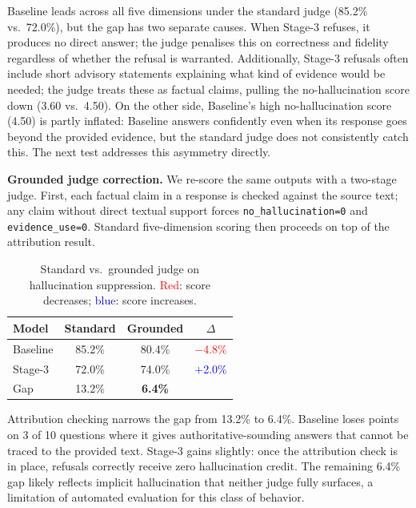 Baseline leads across all five dimensions under the standard judge
(85.2\% vs.\ 72.0\%), but the gap has two separate causes.
When Stage-3 refuses, it produces no direct answer; the judge penalises this
on correctness and fidelity regardless of whether the refusal is warranted.
Additionally, Stage-3 refusals often include short advisory statements
explaining what kind of evidence would be needed; the judge treats these as
factual claims, pulling the no-hallucination score down (3.60 vs.\ 4.50).
On the other side, Baseline's high no-hallucination score (4.50) is partly
inflated: Baseline answers confidently even when its response goes beyond the
provided evidence, but the standard judge does not consistently catch this.
The next test addresses this asymmetry directly.

\noindent\textbf{Grounded judge correction.}
We re-score the same outputs with a two-stage judge.
First, each factual claim in a response is checked against the source text;
any claim without direct textual support forces \texttt{no\_hallucination=0}
and \texttt{evidence\_use=0}.
Standard five-dimension scoring then proceeds on top of the attribution result.

\begin{table}[htbp]
\centering
\caption{Standard vs.\ grounded judge on hallucination suppression.
\textcolor{red}{Red}: score decreases; \textcolor{blue}{blue}: score increases.}
\label{tab:grounded}
\small
\begin{tabular}{@{}lccc@{}}
\toprule
Model & Standard & Grounded & $\Delta$ \\
\midrule
Baseline & 85.2\% & 80.4\% & \textcolor{red}{$-$4.8\%} \\
Stage-3  & 72.0\% & 74.0\% & \textcolor{blue}{$+$2.0\%} \\
\midrule
Gap & 13.2\% & \textbf{6.4\%} & \\
\bottomrule
\end{tabular}
\end{table}

Attribution checking narrows the gap from 13.2\% to 6.4\%.
Baseline loses points on 3 of 10 questions where it gives authoritative-sounding
answers that cannot be traced to the provided text.
Stage-3 gains slightly: once the attribution check is in place, refusals
correctly receive zero hallucination credit.
The remaining 6.4\% gap likely reflects implicit hallucination that neither
judge fully surfaces, a limitation of automated evaluation for this class of
behavior.

